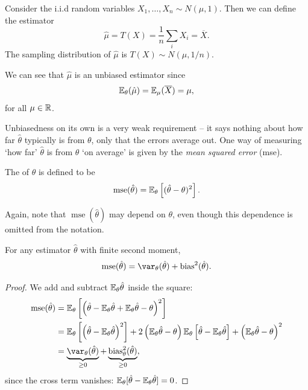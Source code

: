 \documentclass[a4paper]{scrartcl}
\newcommand{\bias}{\operatorname{bias}}
\newcommand{\mse}{\operatorname{mse}}
\begin{document}
\begin{example}
  Consider the i.i.d random variables $X_1, \dots, X_n \sim N(\mu, 1)$. Then we can define the estimator
  $$
  \hat{\mu} = T(X) = \frac{1}{n}\sum_{i} X_i = \overline{X}.
  $$
  The sampling distribution of $\hat{\mu}$ is $T(X) \sim N(\mu, 1/n)$.

  We can see that $\hat{\mu}$ is an unbiased estimator since
  $$
  \mathbb{E}_\theta(\hat{\mu}) = \mathbb{E}_{\mu}(\overline{X}) = \mu,
  $$
  for all $\mu \in \mathbb{R}$.
\end{example}

Unbiasedness on its own is a very weak requirement -- it says nothing about how far $\hat\theta$ typically is from $\theta$, only that the errors average out. One way of measuring `how far' $\hat{\theta}$ is from $\theta$ `on average' is given by the \emph{mean squared error} (mse).

\begin{definition}
The  of $\hat\theta$ is defined to be
$$
\mse(\hat{\theta}) = \EE_{\theta}\left[(\hat{\theta} - \theta)^2\right].
$$
\end{definition}

Again, note that $\mse(\hat{\theta})$ may depend on $\theta$, even though this dependence is omitted from the notation.

\begin{proposition}
  For any estimator $\hat\theta$ with finite second moment,
  $$
  \mse(\hat\theta) = \var_\theta(\hat\theta) + \bias^2(\hat\theta).
  $$
\end{proposition}
\begin{proof}
  We add and subtract $\mathbb{E}_\theta\hat\theta$ inside the square:
  \begin{align*}
      \mse(\hat{\theta}) &= \EE_{\theta}\left[\left(\hat{\theta}- \EE_\theta\hat\theta + \EE_{\theta} \hat{\theta}-\theta\right)^{2}\right] \\
      &= \EE_\theta\left[\left(\hat\theta - \EE_\theta \hat\theta\right)^2\right] + 2\left(\EE_\theta\hat\theta - \theta\right)\EE_\theta\left[\hat\theta - \EE_\theta\hat\theta\right] + \left(\EE_\theta\hat\theta - \theta\right)^2\\
      &=\underbrace{\var_\theta(\hat{\theta})}_{\geq 0}+\underbrace{\bias_\theta^{2}(\hat{\theta})}_{\geq 0},
  \end{align*}
  since the cross term vanishes: $\mathbb{E}_\theta[\hat\theta - \mathbb{E}_\theta\hat\theta] = 0$.
\end{proof}
\end{document}
